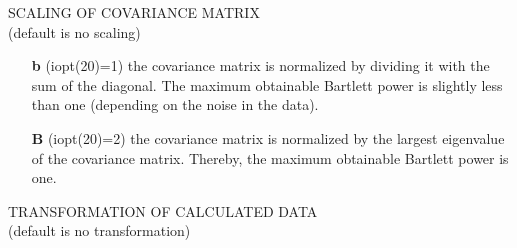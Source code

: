 \documentclass{saclantc}
\begin{document}
\noindent SCALING OF COVARIANCE MATRIX\\
(default is no scaling)
\vspace{-0.6cm}
\begin{itemize}
    \item[{\bf b}] (iopt(20)=1)   the 
covariance matrix is normalized by dividing it with the sum of the
 diagonal. The maximum obtainable 
 Bartlett power is slightly less than one (depending on the noise in the data).
\vspace{-0.3cm}
    \item[{\bf B}] (iopt(20)=2)   the 
covariance matrix is normalized by the largest eigenvalue of 
the covariance matrix. Thereby, the maximum obtainable  Bartlett power is one.
\end{itemize}

\noindent TRANSFORMATION OF CALCULATED DATA\\
(default is no transformation)
\vspace{-0.6cm}
\end{document}
